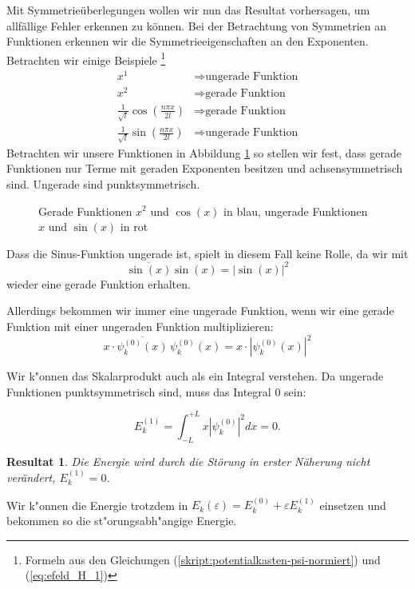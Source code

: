 \begin{refsection}
Mit Symmetrie\"uberlegungen wollen wir nun das Resultat vorhersagen, um allf\"allige Fehler erkennen zu k\"onnen.
Bei der Betrachtung von Symmetrien an Funktionen erkennen wir die Symmetrieeigenschaften an den Exponenten.
Betrachten wir einige Beispiele 
\footnote{Formeln aus den Gleichungen (\ref{skript:potentialkasten-psi-normiert}) und (\ref{eq:efeld_H_1})}
\begin{equation}
\begin{aligned}
x^1 &\Rightarrow \text{ungerade Funktion}
\\
x^2 &\Rightarrow \text{gerade Funktion}
\\
\frac{1}{\sqrt{l}}\cos\left( \frac{n \pi x}{2l} \right)  &\Rightarrow \text{gerade Funktion}
\\
\frac{1}{\sqrt{l}}\sin\left( \frac{n \pi x}{2l} \right)  &\Rightarrow \text{ungerade Funktion}
\end{aligned}
\end{equation}
Betrachten wir unsere Funktionen in Abbildung \ref{abb:efeld_gerade_ungerade} so stellen wir fest, 
dass gerade Funktionen nur Terme mit geraden Exponenten besitzen und achsensymmetrisch sind.
Ungerade sind punktsymmetrisch.

\begin{figure}
  \centering
{}
 \caption{Gerade Funktionen $x^2$ und $\cos(x)$ in blau, ungerade Funktionen $x$ und $\sin(x)$ in rot}
 \label{abb:efeld_gerade_ungerade}
\end{figure}

Dass die Sinus-Funktion ungerade ist, spielt in diesem Fall keine Rolle, da wir mit 
\[
  \overline{\sin(x)} \sin(x) = |\sin(x)|^2
\]
wieder eine gerade Funktion erhalten.

Allerdings bekommen wir immer eine ungerade Funktion, wenn wir eine gerade Funktion mit einer ungeraden Funktion multiplizieren:
\[ 
  x \cdot \overline{\psi_k^{(0)}(x)} \, \psi_k^{(0)}(x) = x \cdot |\psi_k^{(0)}(x)|^2
\]

Wir k"onnen das Skalarprodukt auch als ein Integral verstehen.
Da ungerade Funktionen punktsymmetrisch sind, muss das Integral $0$ sein:
\newtheorem{result}{Resultat}[chapter]
\[
  E_k^{(1)} = \int_{-L}^{+L} x |\psi_k^{(0)}|^2 dx = 0 .
\]
\begin{result}
Die Energie wird durch die St\"orung in erster N\"aherung
nicht ver\"andert, $E_k^{(1)} = 0$.
\end{result}
Wir k"onnen die Energie trotzdem in
$E_k(\varepsilon)=E_k^{(0)} + \varepsilon E_k^{(1)}$ einsetzen
und bekommen so die st"orungsabh"angige Energie.







\end{refsection}

